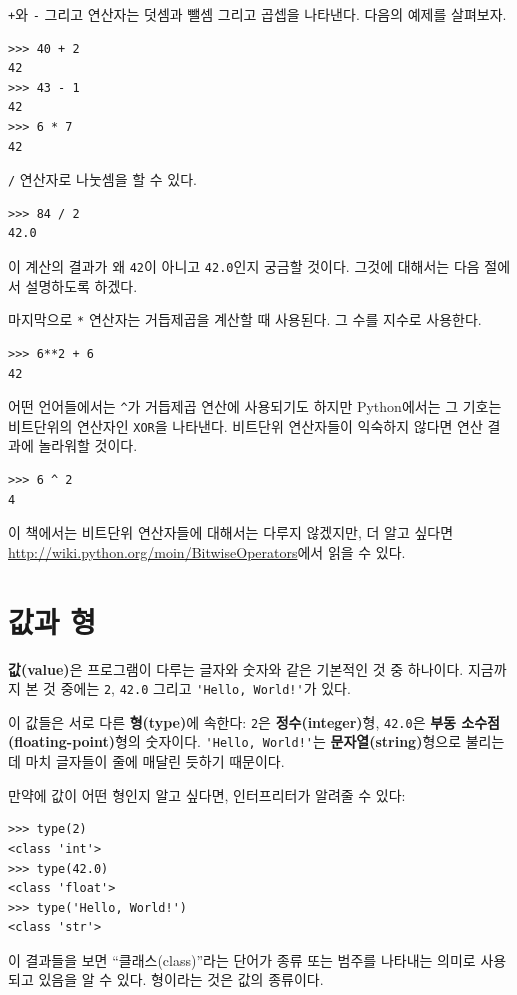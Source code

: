 \documentclass[10pt]{book}
\begin{document}
{\tt +}와 {\tt -} 그리고 {\tt *} 연산자는 덧셈과 뺄셈 그리고 곱셉을
나타낸다. 다음의 예제를 살펴보자.

\begin{verbatim}
>>> 40 + 2
42
>>> 43 - 1
42
>>> 6 * 7
42
\end{verbatim}
%
{\tt /} 연산자로 나눗셈을 할 수 있다.

\begin{verbatim}
>>> 84 / 2
42.0
\end{verbatim}
%
이 계산의 결과가 왜 {\tt 42}이 아니고 {\tt 42.0}인지 궁금할
것이다. 그것에 대해서는 다음 절에서 설명하도록 하겠다.

마지막으로 {\tt **} 연산자는 거듭제곱을 계산할 때 사용된다. 그 수를
지수로 사용한다.

\begin{verbatim}
>>> 6**2 + 6
42
\end{verbatim}
%
어떤 언어들에서는 \verb"^"가 거듭제곱 연산에 사용되기도 하지만
Python에서는 그 기호는 비트단위의 연산자인 \texttt{XOR}을
나타낸다. 비트단위 연산자들이 익숙하지 않다면 연산 결과에 놀라워할
것이다.

\begin{verbatim}
>>> 6 ^ 2
4
\end{verbatim}
%
이 책에서는 비트단위 연산자들에 대해서는 다루지 않겠지만, 더 알고
싶다면 \url{http://wiki.python.org/moin/BitwiseOperators}에서 읽을 수
있다.


\section{값과 형}

{\bf 값(value)}은 프로그램이 다루는 글자와 숫자와 같은 기본적인 것 중
하나이다.  지금까지 본 것 중에는 {\tt 2}, {\tt 42.0} 그리고
\verb"'Hello, World!'"가 있다.

이 값들은 서로 다른 {\bf 형(type)}에 속한다: {\tt 2}은 {\bf
  정수(integer)}형, {\tt 42.0}은 {\bf 부동 소수점(floating-point)}형의
숫자이다.  \verb"'Hello, World!'"는 {\bf 문자열(string)}형으로 불리는데
마치 글자들이 줄에 매달린 듯하기 때문이다.

만약에 값이 어떤 형인지 알고 싶다면, 인터프리터가 알려줄 수 있다:

\begin{verbatim}
>>> type(2)
<class 'int'>
>>> type(42.0)
<class 'float'>
>>> type('Hello, World!')
<class 'str'>
\end{verbatim}
%
이 결과들을 보면 ``클래스(class)''라는 단어가 종류 또는 범주를 나타내는
의미로 사용되고 있음을 알 수 있다.  형이라는 것은 값의 종류이다.
\end{document}
